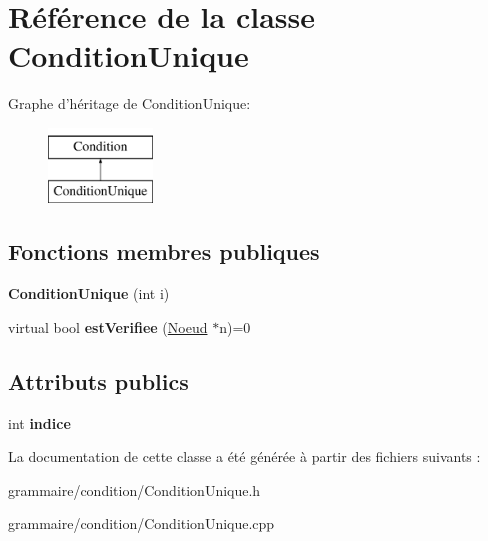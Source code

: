\hypertarget{class_condition_unique}{\section{Référence de la classe Condition\-Unique}
\label{class_condition_unique}
}
Graphe d'héritage de Condition\-Unique\-:\begin{figure}[H]
\begin{center}
\leavevmode
\includegraphics[height=2.000000cm]{class_condition_unique}
\end{center}
\end{figure}
\subsection*{Fonctions membres publiques}
\begin{DoxyCompactItemize}
\item 
\hypertarget{class_condition_unique_a6c0dde3aeaba3ecc47d7cbbc1b989015}{{\bfseries Condition\-Unique} (int i)}\label{class_condition_unique_a6c0dde3aeaba3ecc47d7cbbc1b989015}

\item 
\hypertarget{class_condition_unique_a6bf935dd0212e00c2ad83f25bddc091c}{virtual bool {\bfseries est\-Verifiee} (\hyperlink{class_noeud}{Noeud} $\ast$n)=0}\label{class_condition_unique_a6bf935dd0212e00c2ad83f25bddc091c}

\end{DoxyCompactItemize}
\subsection*{Attributs publics}
\begin{DoxyCompactItemize}
\item 
\hypertarget{class_condition_unique_ad629e86f3c6d9d8fdeedc7de1118e1ce}{int {\bfseries indice}}\label{class_condition_unique_ad629e86f3c6d9d8fdeedc7de1118e1ce}

\end{DoxyCompactItemize}


La documentation de cette classe a été générée à partir des fichiers suivants \-:\begin{DoxyCompactItemize}
\item 
grammaire/condition/Condition\-Unique.\-h\item 
grammaire/condition/Condition\-Unique.\-cpp\end{DoxyCompactItemize}
